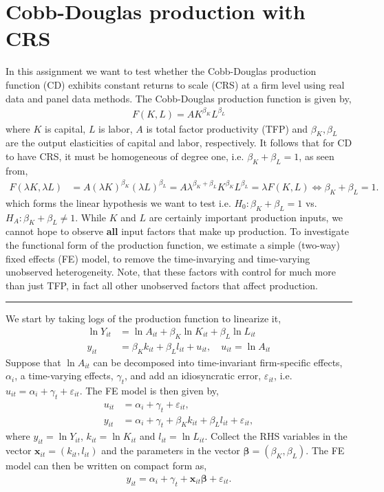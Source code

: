 \section{Cobb-Douglas production with CRS}

In this assignment we want to test whether the Cobb-Douglas production function (CD) exhibits constant returns to scale (CRS) at a firm level using real data and panel data methods. The Cobb-Douglas production function is given by,
\begin{align*}
    F(K,L) = A K^{\beta_K} L^{\beta_L}
\end{align*}
where $K$ is capital, $L$ is labor, $A$ is total factor productivity (TFP) and $\beta_K, \beta_L$ are the output elasticities of capital and labor, respectively.
It follows that for CD to have CRS, it must be homogeneous of degree one, i.e. $\beta_K + \beta_L = 1$, as seen from,
\begin{align*}
    F(\lambda K, \lambda L) &= A (\lambda K)^{\beta_K} (\lambda L)^{\beta_L} = A \lambda^{\beta_K + \beta_L} K^{\beta_K} L^{\beta_L} = \lambda F(K,L) \iff \beta_K + \beta_L = 1.
\end{align*} 
which forms the linear hypothesis we want to test i.e. $H_0: \beta_K + \beta_L = 1$ vs. $H_A: \beta_K + \beta_L \neq 1$.
While $K$ and $L$ are certainly important production inputs, we cannot hope to observe \textbf{all} input factors that make up production. To investigate the functional form of the production function, we estimate a simple (two-way) fixed effects (FE) model, to remove the time-invarying and time-varying unobserved heterogeneity. Note, that these factors with control for much more than just TFP, in fact all other unobserved factors that affect production. 

\hrule

We start by taking logs of the production function to linearize it,
\begin{align*}
    \ln Y_{it} &= \ln A_{it} + \beta_K \ln K_{it} + \beta_L \ln L_{it} \\
    y_{it} &= \beta_K k_{it} + \beta_L l_{it} + u_{it}, \quad u_{it} = \ln A_{it}
\end{align*}
Suppose that $\ln A_{it}$ can be decomposed into time-invariant firm-specific effects, $\alpha_i$, a time-varying effects, $\gamma_t$, and add an idiosyncratic error, $\varepsilon_{it}$, i.e. $u_{it} = \alpha_i + \gamma_t + \varepsilon_{it}$. The FE model is then given by,
\begin{align*}
    u_{it} &= \alpha_i + \gamma_t + \varepsilon_{it}, \\
    y_{it} &= \alpha_i + \gamma_t + \beta_K k_{it} + \beta_L l_{it} + \varepsilon_{it},
\end{align*} 
where $y_{it} = \ln Y_{it}$, $k_{it} = \ln K_{it}$ and $l_{it} = \ln L_{it}$. Collect the RHS variables in the vector $\bm{x}_{it} = (k_{it}, l_{it})$ and the parameters in the vector $\bm{\beta} = (\beta_K, \beta_L)$. The FE model can then be written on compact form as,
\begin{align*}
    y_{it} = \alpha_i + \gamma_t + \bm{x}_{it} \bm{\beta} + \varepsilon_{it}.
\end{align*}

